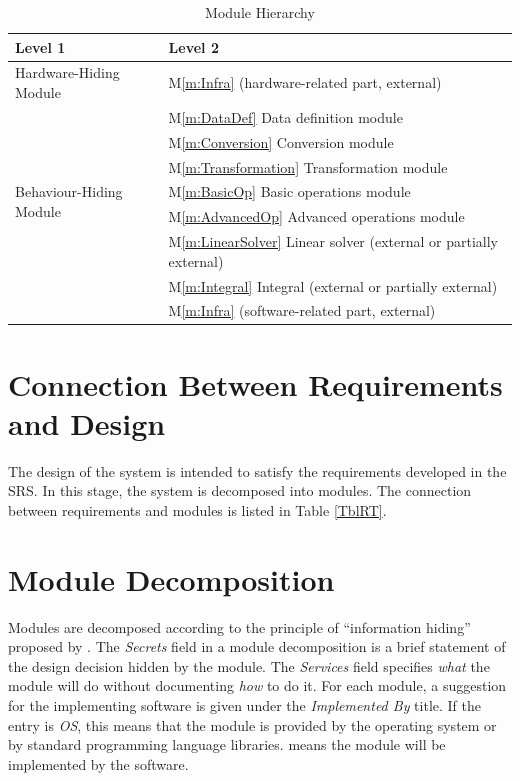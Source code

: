 \documentclass[12pt, titlepage]{article}
\newcommand{\mref}[1]{M\ref{m:#1}}
\begin{document}

\begin{table}[h!]
\centering
\begin{tabular}{p{} p{}}
\toprule
\textbf{Level 1} & \textbf{Level 2}\\
\midrule

{Hardware-Hiding Module} & \mref{Infra} (hardware-related part, external)\\
\midrule

\multirow{7}{0.3\textwidth}{Behaviour-Hiding Module} 
& \mref{DataDef} Data definition module\\
& \mref{Conversion} Conversion module\\
& \mref{Transformation} Transformation module\\
& \mref{BasicOp} Basic operations module\\
& \mref{AdvancedOp} Advanced operations module\\
\midrule

\multirow{3}{0.3\textwidth}{Software Decision Module} 
& \mref{LinearSolver} Linear solver (external or partially external)\\
& \mref{Integral} Integral (external or partially external)\\
& \mref{Infra} (software-related part, external)\\
\bottomrule

\end{tabular}
\caption{Module Hierarchy}
\label{TblMH}
\end{table}

\section{Connection Between Requirements and Design} \label{SecConnection}

The design of the system is intended to satisfy the requirements developed in
the SRS. In this stage, the system is decomposed into modules. The connection
between requirements and modules is listed in Table \ref{TblRT}.

\section{Module Decomposition} \label{SecMD}

Modules are decomposed according to the principle of ``information hiding''
proposed by \citet{ParnasEtAl1984}. The \emph{Secrets} field in a module
decomposition is a brief statement of the design decision hidden by the
module. The \emph{Services} field specifies \emph{what} the module will do
without documenting \emph{how} to do it. For each module, a suggestion for the
implementing software is given under the \emph{Implemented By} title. If the
entry is \emph{OS}, this means that the module is provided by the operating
system or by standard programming language libraries.  \emph{\progname{}} means the
module will be implemented by the \progname{} software.
\end{document}
